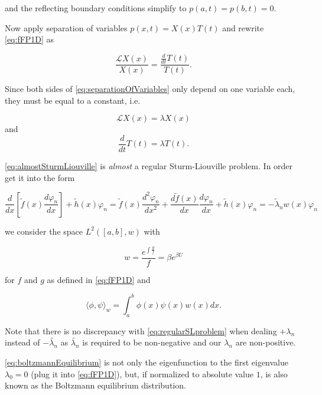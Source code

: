 and the reflecting boundary conditions simplify to $p(a,t)=p(b,t)=0$.

Now apply separation of variables $p(x,t)=X(x)T(t)$ and rewrite \eqref{eq:fFP1D} as

\begin{equation}\label{eq:separationOfVariables}
\frac{\mathcal{L}X(x)}{X(x)} = \frac{\frac{d}{dt}T(t)}{T(t)}.
\end{equation}

Since both sides of \eqref{eq:separationOfVariables} only depend on one variable each, they must be equal to a constant, i.e.

\begin{equation}\label{eq:almostSturmLiouville}
\mathcal{L}X(x) = \lambda X(x)
\end{equation}
and
\begin{equation*}
\frac{d}{dt}T(t)=\lambda T(t).
\end{equation*}

\eqref{eq:almostSturmLiouville} is \textit{almost} a regular Sturm-Liouville problem. In order get it into the form

\begin{equation}\label{eq:regularSLproblem}
\frac{d}{dx}\left[\tilde{f}(x)\frac{d\varphi_n}{dx} \right] + \tilde{h}(x)\varphi_n = \tilde{f}(x)\frac{d^2 \varphi_n}{dx^2} + \frac{d \tilde{f}(x)}{dx}\frac{d \varphi_n}{dx}+ \tilde{h}(x)\varphi_n = -\tilde{\lambda}_n w(x)\varphi_n
\end{equation}

we consider the space $L^2([a,b],w)$ with 

\begin{equation}\label{eq:boltzmannEquilibrium}
w = \frac{e^{\int \frac{g}{f}}}{f} = \beta e^{\beta U}
\end{equation}

for $f$ and $g$ as defined in \eqref{eq:fFP1D} and 

\begin{equation*}
\langle \phi, \psi \rangle_w = \int_a^b \phi(x)\psi(x)w(x)dx.
\end{equation*}

Note that there is no discrepancy with \eqref{eq:regularSLproblem} when dealing $+\lambda_n$ instead of $-\tilde{\lambda_n}$ as $\tilde{\lambda_n}$ is required to be non-negative and our $\lambda_n$ are non-positive.

\eqref{eq:boltzmannEquilibrium} is not only the eigenfunction to the first eigenvalue $\lambda_0 = 0$ (plug it into \eqref{eq:fFP1D}), but, if normalized to absolute value $1$, is also known as the Boltzmann equilibrium distribution.

